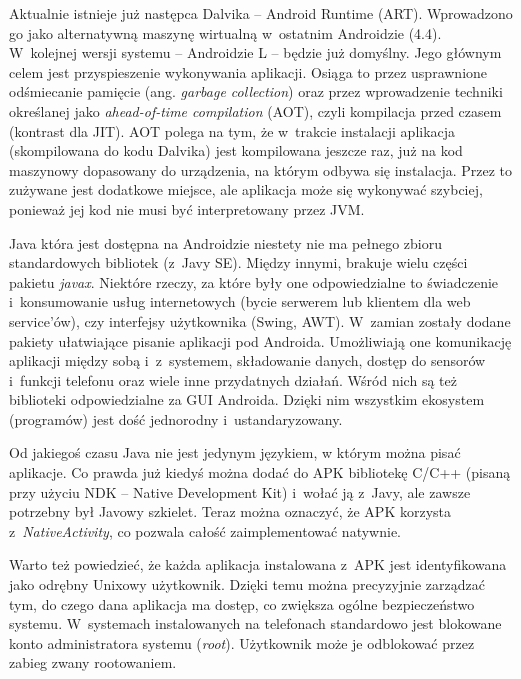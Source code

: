 Aktualnie istnieje już następca Dalvika -- Android Runtime (ART). Wprowadzono go jako alternatywną maszynę wirtualną w~ostatnim Androidzie (4.4)\cite{androidart}. W~kolejnej wersji systemu -- Androidzie L -- będzie już domyślny\cite{androidlpreview}. Jego głównym celem jest przyspieszenie wykonywania aplikacji. Osiąga to przez usprawnione odśmiecanie pamięcie (ang. \emph{garbage collection}) oraz przez wprowadzenie techniki określanej jako \emph{ahead-of-time compilation} (AOT), czyli kompilacja przed czasem (kontrast dla JIT). AOT polega na tym, że w~trakcie instalacji aplikacja (skompilowana do kodu Dalvika) jest kompilowana jeszcze raz, już na kod maszynowy dopasowany do urządzenia, na którym odbywa się instalacja. Przez to zużywane jest dodatkowe miejsce, ale aplikacja może się wykonywać szybciej, ponieważ jej kod nie musi być interpretowany przez JVM.

Java która jest dostępna na Androidzie niestety nie ma pełnego zbioru standardowych bibliotek (z~Javy SE). Między innymi, brakuje wielu części pakietu \emph{javax}. Niektóre rzeczy, za które były one odpowiedzialne to świadczenie i~konsumowanie usług internetowych (bycie serwerem lub klientem dla web service'ów), czy interfejsy użytkownika (Swing, AWT). W~zamian zostały dodane pakiety ułatwiające pisanie aplikacji pod Androida. Umożliwiają one komunikację aplikacji między sobą i~z~systemem, składowanie danych, dostęp do sensorów i~funkcji telefonu oraz wiele inne przydatnych działań\cite{androidpackage}. Wśród nich są też biblioteki odpowiedzialne za GUI Androida. Dzięki nim wszystkim ekosystem (programów) jest dość jednorodny i~ustandaryzowany.

Od jakiegoś czasu Java nie jest jedynym językiem, w którym można pisać aplikacje. Co prawda już kiedyś można dodać do APK bibliotekę C/C++ (pisaną przy użyciu NDK -- Native Development Kit\cite{androidndk}) i~wołać ją z~Javy, ale zawsze potrzebny był Javowy szkielet. Teraz można oznaczyć, że APK korzysta z~\emph{NativeActivity}\cite{androidnativeactivity}, co pozwala całość zaimplementować natywnie. 

Warto też powiedzieć, że każda aplikacja instalowana z~APK jest identyfikowana jako odrębny Unixowy użytkownik\cite{androidpermissions}. Dzięki temu można precyzyjnie zarządzać tym, do czego dana aplikacja ma dostęp, co zwiększa ogólne bezpieczeństwo systemu. W~systemach instalowanych na telefonach standardowo jest blokowane konto administratora systemu (\emph{root}). Użytkownik może je odblokować przez zabieg zwany rootowaniem.

